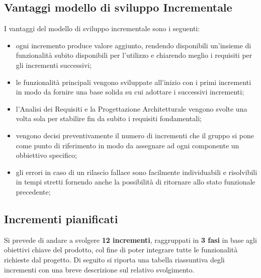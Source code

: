 \subsection{Vantaggi modello di sviluppo Incrementale}
	I vantaggi del modello di sviluppo incrementale sono i seguenti:
	\begin{itemize}
		\item ogni incremento produce valore aggiunto, rendendo disponibili un'insieme di funzionalità subito disponibili per l'utilizzo e chiarendo meglio i requisiti per gli incrementi successivi;
		\item le funzionalità principali vengono sviluppate all'inizio con i primi incrementi in modo da fornire una base solida su cui adottare i successivi incrementi;
		\item l'Analisi dei Requisiti e la Progettazione Architetturale vengono svolte una volta sola per stabilire fin da subito i requisiti fondamentali;
		\item vengono decisi preventivamente il numero di incrementi che il gruppo si pone come punto di riferimento in modo da assegnare ad ogni componente un obbiettivo specifico;
		\item gli errori in caso di un rilascio fallace sono facilmente individuabili e risolvibili in tempi stretti fornendo anche la possibilità di ritornare allo stato funzionale precedente;
	\end{itemize}

\subsection{Incrementi pianificati}

Si prevede di andare a svolgere \textbf{12 incrementi}, raggruppati in \textbf{3 fasi} in base agli obiettivi chiave del prodotto, col fine di poter integrare tutte le funzionalità richieste dal progetto. Di seguito si riporta una tabella riassuntiva degli incrementi con una breve descrizione sul relativo svolgimento.

